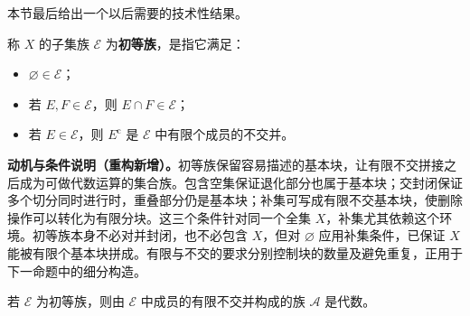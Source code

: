 \documentclass[../../main.tex]{subfiles}%
\begin{document}
本节最后给出一个以后需要的技术性结果。
\begin{definition}[初等族]\label{definition:ch01-elementary-family}
称 $X$ 的子集族 $\mathscr{E}$ 为\textbf{初等族}，是指它满足：
\begin{itemize}
\item $\varnothing\in\mathscr{E}$；
\item 若 $E,F\in\mathscr{E}$，则 $E\cap F\in\mathscr{E}$；
\item 若 $E\in\mathscr{E}$，则 $E^{\mathrm{c}}$ 是 $\mathscr{E}$ 中有限个成员的不交并。
\end{itemize}
\end{definition}
\begin{remark}
\textbf{动机与条件说明（重构新增）。}初等族保留容易描述的基本块，让有限不交拼接之后成为可做代数运算的集合族。包含空集保证退化部分也属于基本块；交封闭保证多个切分同时进行时，重叠部分仍是基本块；补集可写成有限不交基本块，使删除操作可以转化为有限分块。这三个条件针对同一个全集 $X$，补集尤其依赖这个环境。初等族本身不必对并封闭，也不必包含 $X$，但对 $\varnothing$ 应用补集条件，已保证 $X$ 能被有限个基本块拼成。有限与不交的要求分别控制块的数量及避免重复，正用于下一命题中的细分构造。
\end{remark}



\begin{proposition}\label{proposition:ch01-elementary-algebra}
若 $\mathscr{E}$ 为初等族，则由 $\mathscr{E}$ 中成员的有限不交并构成的族 $\mathscr{A}$ 是代数。
\end{proposition}
\end{document}
